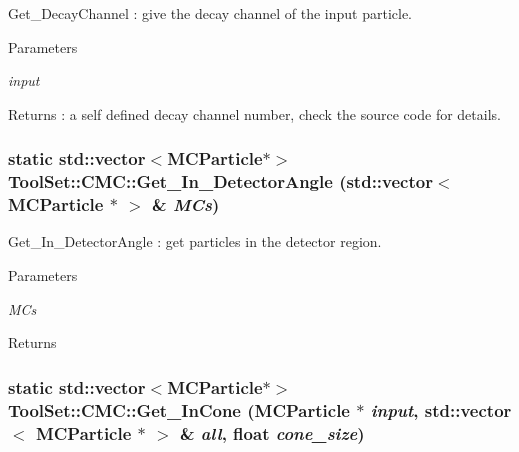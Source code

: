 Get\_\-DecayChannel : give the decay channel of the input particle. 
\begin{DoxyParams}{Parameters}
\item[{\em input}]\end{DoxyParams}
\begin{DoxyReturn}{Returns}
: a self defined decay channel number, check the source code for details. 
\end{DoxyReturn}
\hypertarget{classToolSet_1_1CMC_a92dc2c0c2bfdaa05ebeebeaf90d4a50a}{
\subsubsection[{Get\_\-In\_\-DetectorAngle}]{\setlength{\rightskip}{0pt plus 5cm}static std::vector$<$MCParticle$\ast$$>$ ToolSet::CMC::Get\_\-In\_\-DetectorAngle (std::vector$<$ MCParticle $\ast$ $>$ \& {\em MCs})}}
\label{classToolSet_1_1CMC_a92dc2c0c2bfdaa05ebeebeaf90d4a50a}


Get\_\-In\_\-DetectorAngle : get particles in the detector region. 
\begin{DoxyParams}{Parameters}
\item[{\em MCs}]\end{DoxyParams}
\begin{DoxyReturn}{Returns}

\end{DoxyReturn}
\hypertarget{classToolSet_1_1CMC_a721fbac55172fef2776b1637d55de936}{
\subsubsection[{Get\_\-InCone}]{\setlength{\rightskip}{0pt plus 5cm}static std::vector$<$MCParticle$\ast$$>$ ToolSet::CMC::Get\_\-InCone (MCParticle $\ast$ {\em input}, \/  std::vector$<$ MCParticle $\ast$ $>$ \& {\em all}, \/  float {\em cone\_\-size})}}
\label{classToolSet_1_1CMC_a721fbac55172fef2776b1637d55de936}



